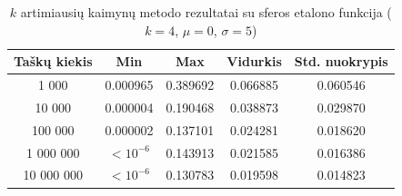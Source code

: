 \begin{table}[H]
    \centering
    \begin{tabular}{|c|c|c|c|c|}
        \hline
        \textbf{Taškų kiekis} & \textbf{Min} & \textbf{Max} & \textbf{Vidurkis} & \textbf{Std. nuokrypis} \\ \hline
        1 000        & 0.000965 & 0.389692 & 0.066885 & 0.060546 \\ \hline
        10 000       & 0.000004 & 0.190468 & 0.038873 & 0.029870 \\ \hline
        100 000      & 0.000002 & 0.137101 & 0.024281 & 0.018620 \\ \hline
        1 000 000    & $<10^{-6}$ & 0.143913 & 0.021585 & 0.016386 \\ \hline
        10 000 000   & $<10^{-6}$ & 0.130783 & 0.019598 & 0.014823 \\ \hline
    \end{tabular}
    \caption{$k$ artimiausių kaimynų metodo rezultatai su sferos etalono funkcija ($k = 4$, $\mu = 0$, $\sigma = 5$)}
\end{table}